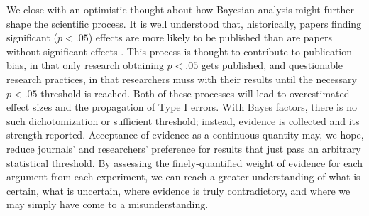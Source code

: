 \documentclass[man]{apa6}
\begin{document}
We close with an optimistic thought about how Bayesian analysis might further shape the scientific process. It is well understood that, historically, papers finding significant ($p < .05$) effects are more likely to be published than are papers without significant effects \citep{Cooper:etal:1997,Atkinson:etal:1982}. This process is thought to contribute to publication bias, in that only research obtaining $p<.05$ gets published, and questionable research practices, in that researchers muss with their results until the necessary $p < .05$ threshold is reached. Both of these processes will lead to overestimated effect sizes and the propagation of Type I errors. %
With Bayes factors, there is no such dichotomization or sufficient threshold; instead, evidence is collected and its strength reported. Acceptance of evidence as a continuous quantity may, we hope, reduce journals' and researchers' preference for results that just pass an arbitrary statistical threshold. By assessing the finely-quantified weight of evidence for each argument from each experiment, we can reach a greater understanding of what is certain, what is uncertain, where evidence is truly contradictory, and where we may simply have come to a misunderstanding.


\end{document}
